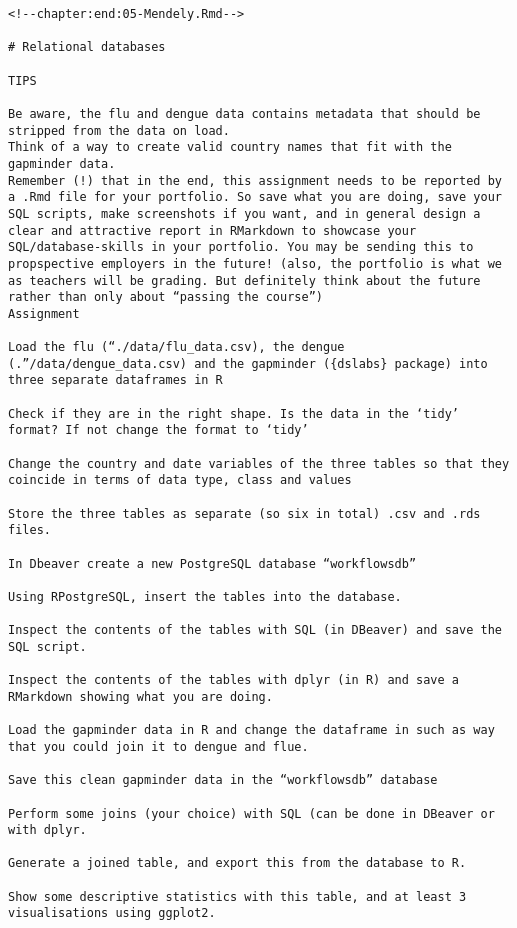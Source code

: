 \documentclass[
]{book}
\begin{document}
\begin{verbatim}
<!--chapter:end:05-Mendely.Rmd-->

# Relational databases

TIPS

Be aware, the flu and dengue data contains metadata that should be stripped from the data on load.
Think of a way to create valid country names that fit with the gapminder data.
Remember (!) that in the end, this assignment needs to be reported by a .Rmd file for your portfolio. So save what you are doing, save your SQL scripts, make screenshots if you want, and in general design a clear and attractive report in RMarkdown to showcase your SQL/database-skills in your portfolio. You may be sending this to propspective employers in the future! (also, the portfolio is what we as teachers will be grading. But definitely think about the future rather than only about “passing the course”)
Assignment

Load the flu (“./data/flu_data.csv), the dengue (.”/data/dengue_data.csv) and the gapminder ({dslabs} package) into three separate dataframes in R

Check if they are in the right shape. Is the data in the ‘tidy’ format? If not change the format to ‘tidy’

Change the country and date variables of the three tables so that they coincide in terms of data type, class and values

Store the three tables as separate (so six in total) .csv and .rds files.

In Dbeaver create a new PostgreSQL database “workflowsdb”

Using RPostgreSQL, insert the tables into the database.

Inspect the contents of the tables with SQL (in DBeaver) and save the SQL script.

Inspect the contents of the tables with dplyr (in R) and save a RMarkdown showing what you are doing.

Load the gapminder data in R and change the dataframe in such as way that you could join it to dengue and flue.

Save this clean gapminder data in the “workflowsdb” database

Perform some joins (your choice) with SQL (can be done in DBeaver or with dplyr.

Generate a joined table, and export this from the database to R.

Show some descriptive statistics with this table, and at least 3 visualisations using ggplot2.


\end{verbatim}
\end{document}

